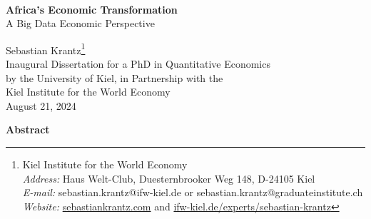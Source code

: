 \documentclass[openany]{book}
\begin{document}
\begin{titlepage}
    \begin{center}
        \hphantom{a}\\
        \Huge\textbf{Africa's Economic Transformation}\\A Big Data Economic Perspective
        
        \vspace{1cm}
        \Large Sebastian Krantz\footnote{Kiel Institute for the World Economy\\ \textit{Address:} Haus Welt-Club, Duesternbrooker Weg 148, D-24105 Kiel\\ \textit{E-mail:} sebastian.krantz@ifw-kiel.de or sebastian.krantz@graduateinstitute.ch\\ \textit{Website:} \href{https://sebastiankrantz.com}{sebastiankrantz.com} and \href{https://www.ifw-kiel.de/experts/sebastian-krantz/}{ifw-kiel.de/experts/sebastian-krantz}}\\[1em]Inaugural Dissertation for a PhD in Quantitative Economics\\by the University of Kiel, in Partnership with the\\Kiel Institute for the World Economy
\\[1em]August 21, 2024
        
        
        \vspace{1.7cm} %
        \large \textbf{Abstract}
        

\end{center}
\end{titlepage}
\end{document}
